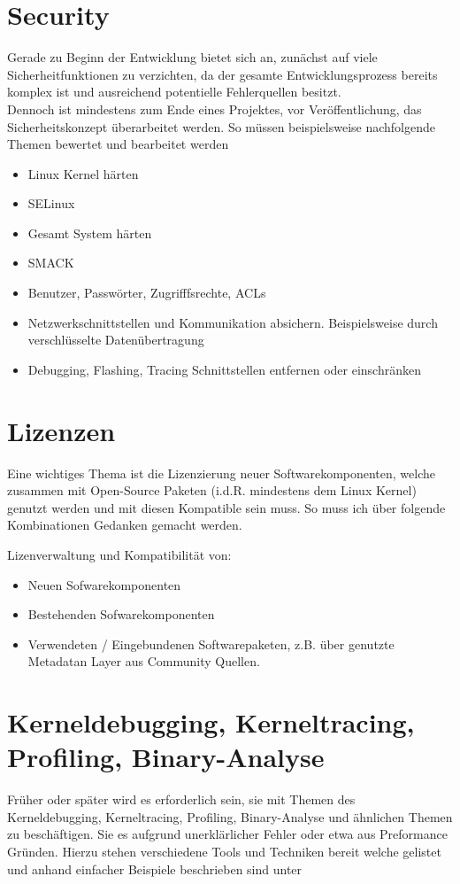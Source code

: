 \section{Security}%
Gerade zu Beginn der Entwicklung bietet sich an, zunächst auf viele
Sicherheit\-funktionen zu verzichten, da der gesamte Entwicklungs\-prozess
bereits komplex ist und ausreichend potentielle Fehlerquellen besitzt.
\\

Dennoch ist mindestens zum Ende eines Projektes, vor Veröffentlichung, das
Sicherheits\-konzept überarbeitet werden.
So müssen beispielsweise nachfolgende Themen bewertet und bearbeitet werden
\label{sec:security}

\begin{itemize}
    \item Linux Kernel härten
    \item SELinux
    \item Gesamt System härten
    \item SMACK
    \item Benutzer, Passwörter, Zugrifffsrechte, ACLs
    \item Netzwerkschnittstellen und Kommunikation absichern. Beispielsweise
        durch verschlüsselte Datenübertragung
    \item Debugging, Flashing, Tracing Schnittstellen entfernen oder
        einschränken
\end{itemize}


\section{Lizenzen}%
\label{sec:lizenzen}

Eine wichtiges Thema ist die Lizenzierung neuer Softwarekomponenten, welche
zusammen mit Open-Source Paketen (i.d.R. mindestens dem Linux Kernel) genutzt
werden und mit diesen Kompatible sein muss. So muss ich über folgende
Kombinationen Gedanken gemacht werden.

Lizenverwaltung und Kompatibilität von:
\begin{itemize}
    \item Neuen Sofwarekomponenten
    \item Bestehenden  Sofwarekomponenten
    \item Verwendeten / Eingebundenen Softwarepaketen, z.B. über genutzte
        Metadatan Layer aus Community Quellen.
\end{itemize}


\section{Kerneldebugging, Kerneltracing, Profiling, Binary-Analyse}
\label{sec:kerneldebugging_kerneltracing_profiling_binaryanalyse}
Früher oder später wird es erforderlich sein, sie mit Themen des
Kerneldebugging, Kerneltracing, Profiling, Binary-Analyse und ähnlichen Themen
zu beschäftigen. Sie es aufgrund unerklärlicher Fehler oder etwa aus Preformance
Gründen. Hierzu stehen verschiedene Tools und Techniken bereit welche gelistet
und anhand einfacher Beispiele beschrieben sind unter \cite[Kapitel 5]{Gonzalez2018:Embedded_Linux_Development_Using_Yocto_Project_Cookbook_2nd}



